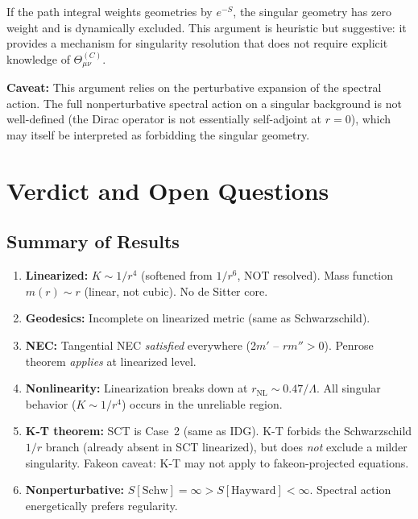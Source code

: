 \documentclass[11pt,a4paper]{article}
\theoremstyle{definition}
\theoremstyle{remark}
\newcommand{\Lam}{\Lambda}
\newcommand{\rNL}{r_{\mathrm{NL}}}
\begin{document}
If the path integral weights geometries by $e^{-S}$, the singular geometry has zero
weight and is dynamically excluded. This argument is heuristic but suggestive: it
provides a mechanism for singularity resolution that does not require explicit
knowledge of $\Theta^{(C)}_{\mu\nu}$.

\textbf{Caveat:} This argument relies on the perturbative expansion of the spectral
action. The full nonperturbative spectral action on a singular background is not
well-defined (the Dirac operator is not essentially self-adjoint at $r = 0$), which
may itself be interpreted as forbidding the singular geometry.

\section{Verdict and Open Questions}

\subsection{Summary of Results}

\begin{enumerate}
  \item \textbf{Linearized:} $K \sim 1/r^4$ (softened from $1/r^6$, NOT resolved).
    Mass function $m(r) \sim r$ (linear, not cubic). No de Sitter core.
  \item \textbf{Geodesics:} Incomplete on linearized metric (same as Schwarzschild).
  \item \textbf{NEC:} Tangential NEC \emph{satisfied} everywhere (2$m'$ -- $r m'' > 0$).
    Penrose theorem \emph{applies} at linearized level.
  \item \textbf{Nonlinearity:} Linearization breaks down at $\rNL \sim 0.47/\Lam$.
    All singular behavior ($K \sim 1/r^4$) occurs in the unreliable region.
  \item \textbf{K-T theorem:} SCT is Case~2 (same as IDG). K-T forbids
    the Schwarzschild $1/r$ branch (already absent in SCT linearized),
    but does \emph{not} exclude a milder singularity. Fakeon caveat:
    K-T may not apply to fakeon-projected equations.
  \item \textbf{Nonperturbative:} $S[\mathrm{Schw}] = \infty > S[\mathrm{Hayward}] < \infty$.
    Spectral action energetically prefers regularity.
\end{enumerate}
\end{document}
